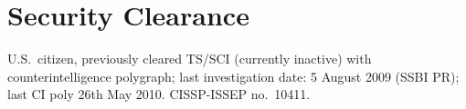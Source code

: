 %
%
\setlength{\fboxsep}{0pt}

\vspace{1mm}
\section*{Security Clearance}
\vspace{-2mm}

U.S.\ citizen, previously cleared TS/SCI (currently inactive) with
counterintelligence polygraph; last investigation date: 5 August 2009
(SSBI PR); last CI poly 26th May 2010. CISSP-ISSEP no.\ 10411.

